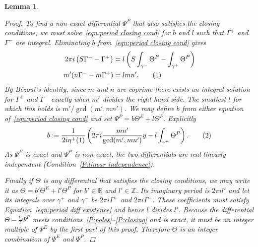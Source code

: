 \documentclass{article}
\numberwithin{equation}{section}
\numberwithin{figure}{section}
\newtheorem{lem}[equation]{Lemma}
\newcommand{\labelthis}[1]{\addtocounter{equation}{1}\tag{\theequation}\label{#1}}
\newcommand{\bra}[1]{\left(#1\right)}
\newcommand{\iu}{i}
\newcommand{\Z}{\mathbb{Z}}
\newcommand{\R}{\mathbb{R}}
\begin{document}
\begin{lem}
\begin{proof}
To find a non-exact differential $\Psi^P$ that also satisfies the closing conditions, we must solve~\eqref{eqn:period closing cond} for $b$ and $l$ such that $\Gamma^+$ and $\Gamma^-$ are integral. Eliminating $b$ from~\eqref{eqn:period closing cond} gives
\begin{align*}
2\pi\iu \bra{ S \Gamma^- - \Gamma^+ }
&= l \bra{S \int_{\gamma^-} \Theta^P - \int_{\gamma^+} \Theta^P} \\
m'(n \Gamma^- - m \Gamma^+)
&= lmn'.
\labelthis{eqn:period diff existence}
\end{align*}
By B\'ezout's identity, since $m$ and $n$ are coprime there exists an integral solution for $\Gamma^+$ and $\Gamma^-$ exactly when $m'$ divides the right hand side. The smallest $l$ for which this holds is $m' / \gcd(m',mn')$. We may define $b$ from either equation of~\eqref{eqn:period closing cond} and set $\Psi^P = b\Theta^E + l\Theta^P$. Explicitly 
\[
b := \frac{1}{2\iu \eta^+(1)}\bra{ 2\pi\iu \frac{mn'}{\gcd(m',mn')}y - l \int_{\gamma^+} \Theta^P }.
\labelthis{eqn:def Psi coeff}
\]
As $\Psi^E$ is exact and $\Psi^P$ is non-exact, the two differentials are real linearly independent (Condition~\ref{P:linear independence}).

Finally if $\Theta$ is any differential that satisfies the closing conditions, we may write it as $\Theta = b'\Theta^E + l'\Theta^P$ for $b'\in\R$ and $l'\in \Z$. Its imaginary period is $2\pi\iu l'$ and let its integrals over $\gamma^+$ and $\gamma^-$ be $2\pi\iu \Gamma^+$ and $2\pi\iu \Gamma^-$. These coefficients must satisfy Equation~\eqref{eqn:period diff existence} and hence $l$ divides $l'$. Because the differential $\Theta - \frac{l'}{l}\Psi^P$ meets conditions~\ref{P:poles}--\ref{P:closing} and is exact, it must be an integer multiple of $\Psi^E$ by the first part of this proof. Therefore $\Theta$ is an integer combination of $\Psi^E$ and $\Psi^P$. 
\end{proof}
\end{lem}

\end{document}
